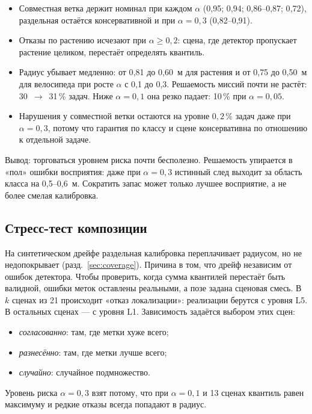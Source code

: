 \begin{table}[H]
\centering\small
\caption{Цена гарантии при разных $\alpha$ (L3): покрытие и радиус совместной ветки, доля отказов по растению, доля задач с найденным путём и доля нарушений}
\label{tab:alpha}

\end{table}

\begin{itemize}[nosep]
  \item Совместная ветка держит номинал при каждом $\alpha$ (0{,}95; 0{,}94; 0{,}86--0{,}87; 0{,}72), раздельная остаётся консервативной и при $\alpha = 0{,}3$ (0{,}82--0{,}91).
  \item Отказы по растению исчезают при $\alpha \ge 0{,}2$: сцена, где детектор пропускает растение целиком, перестаёт определять квантиль.
  \item Радиус убывает медленно: от 0{,}81 до 0{,}60~м для растения и от 0{,}75 до 0{,}50~м для велосипеда при росте $\alpha$ с 0{,}1 до 0{,}3. Решаемость миссий почти не растёт: 30~$\to$~31\,\% задач. Ниже $\alpha = 0{,}1$ она резко падает: 10\,\% при $\alpha = 0{,}05$.
  \item Нарушения у совместной ветки остаются на уровне $0{,}2\,\%$ задач даже при $\alpha = 0{,}3$, потому что гарантия по классу и сцене консервативна по отношению к отдельной задаче.
\end{itemize}
Вывод: торговаться уровнем риска почти бесполезно. Решаемость упирается в «пол» ошибки восприятия: даже при $\alpha = 0{,}3$ истинный след выходит за область класса на 0{,}5--0{,}6~м. Сократить запас может только лучшее восприятие, а не более смелая калибровка.

\subsection{Стресс-тест композиции}\label{sec:composition}

На синтетическом дрейфе раздельная калибровка переплачивает радиусом, но не недопокрывает (разд.~\ref{sec:coverage}). Причина в том, что дрейф независим от ошибок детектора. Чтобы проверить, когда сумма квантилей перестаёт быть валидной, ошибки меток оставлены реальными, а позе задана сценовая смесь. В $k$ сценах из 21 происходит «отказ локализации»: реализации берутся с уровня L5. В остальных сценах --- с уровня L1. Зависимость задаётся выбором этих сцен:
\begin{itemize}[nosep]
  \item \emph{согласованно}: там, где метки хуже всего;
  \item \emph{разнесённо}: там, где метки лучше всего;
  \item \emph{случайно}: случайное подмножество.
\end{itemize}
Уровень риска $\alpha = 0{,}3$ взят потому, что при $\alpha = 0{,}1$ и 13 сценах квантиль равен максимуму и редкие отказы всегда попадают в радиус.

